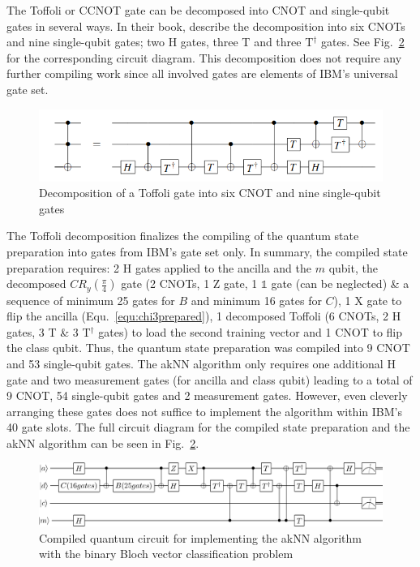 The Toffoli or CCNOT gate can be decomposed into CNOT and single-qubit gates in several ways. In their book, describe the decomposition into six CNOTs and nine single-qubit gates; two H gates, three T and three T$^\dagger$ gates. See Fig.~\ref{img:toffolidecomp} for the corresponding circuit diagram. This decomposition does not require any further compiling work since all involved gates are elements of IBM's universal gate set.

\begin{figure}[!ht]
       \centering
       \includegraphics[scale=0.5]{img/toffolidecomposition.png}
       \caption[]{\label{img:toffolidecomp} Decomposition of a Toffoli gate into six CNOT and nine single-qubit gates\footnotemark[17]}
\end{figure}


The Toffoli decomposition finalizes the compiling of the quantum state preparation into gates from IBM's gate set only. In summary, the compiled state preparation requires: 2 H gates applied to the ancilla and the $m$ qubit, the decomposed $CR_y(\frac{\pi}{4})$ gate (2 CNOTs, 1 Z gate, 1 $\mathbb{1}$ gate (can be neglected) \& a sequence of minimum 25 gates for $B$ and minimum 16 gates for $C$), 1 X gate to flip the ancilla (Equ.~\ref{equ:chi3prepared}), 1 decomposed Toffoli (6 CNOTs, 2 H gates, 3 T \& 3 T$^\dagger$ gates) to load the second training vector and 1 CNOT to flip the class qubit. Thus, the quantum state preparation was compiled into 9 CNOT and 53 single-qubit gates. The akNN algorithm only requires one additional H gate and two measurement gates (for ancilla and class qubit) leading to a total of 9 CNOT, 54 single-qubit gates and 2 measurement gates. However, even cleverly arranging these gates does not suffice to implement the algorithm within IBM's 40 gate slots. The full circuit diagram for the compiled state preparation and the akNN algorithm can be seen in Fig.~\ref{img:toffolidecomp}.

\begin{figure}[!ht]
       \centering
       \includegraphics[width=\textwidth]{img/fullQKNN.png}
       \caption[]{\label{img:toffolidecomp} Compiled quantum circuit for implementing the akNN algorithm with the binary Bloch vector classification problem}
\end{figure}

